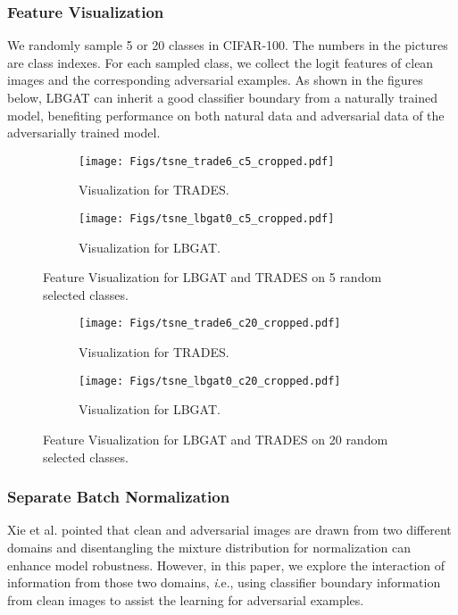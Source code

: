 \documentclass[10pt,twocolumn,letterpaper]{article}
\begin{document}
\subsubsection{Feature Visualization}
We randomly sample 5 or 20 classes in CIFAR-100. The numbers in the pictures are class indexes. For each sampled class, we collect the logit features of clean images and the corresponding adversarial examples. As shown in the figures below, LBGAT can inherit a good classifier boundary from a naturally trained model, benefiting performance on both natural data and adversarial data of the adversarially trained model. 

\begin{figure}
	\begin{subfigure}{.23\textwidth}
		\centering
		\texttt{[image: Figs/tsne\_trade6\_c5\_cropped.pdf]}
		\caption{Visualization for TRADES.}
		\label{fig:sub-first}
	\end{subfigure}
	\begin{subfigure}{.23\textwidth}
		\centering
		\texttt{[image: Figs/tsne\_lbgat0\_c5\_cropped.pdf]}  
		\caption{Visualization for LBGAT.}
		\label{fig:sub-second}
	\end{subfigure}
	\label{fig:tsne_5c}
	\caption{Feature Visualization for LBGAT and TRADES on 5 random selected classes.}
\end{figure}

\begin{figure}
	\begin{subfigure}{.23\textwidth}
		\centering
		\texttt{[image: Figs/tsne\_trade6\_c20\_cropped.pdf]}
		\caption{Visualization for TRADES.}
		\label{fig:tsne_trades6_20c}
	\end{subfigure}
	\begin{subfigure}{.23\textwidth}
		\centering
		\texttt{[image: Figs/tsne\_lbgat0\_c20\_cropped.pdf]}  
		\caption{Visualization for LBGAT.}
		\label{fig:tsne_lbgat0_20c}
	\end{subfigure}
	\label{fig:tsne_20c}
	\caption{Feature Visualization for LBGAT and TRADES on 20 random selected classes.}
\end{figure}

\subsubsection{Separate Batch Normalization}
Xie et al. pointed that clean and adversarial images are drawn from two different domains and disentangling the mixture distribution for normalization can enhance model robustness. However, in this paper, we explore the interaction of information from those two domains, {\textit i.e.}, using classifier boundary information from clean images to assist the learning for adversarial examples.
\end{document}
